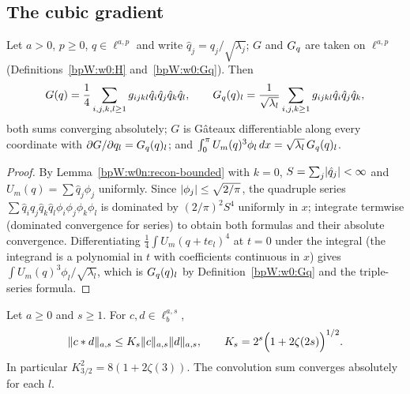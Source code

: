 \subsection{The cubic gradient}\label{bpW:w0n:gradient-sec}

\begin{lemma}\label{bpW:w0n:gradient}
Let $a>0$, $p\ge0$, $q\in\ell^{a,p}$ and write $\hat q_j=q_j/\sqrt{\lambda_j}$; $G$ and $G_q$ are taken on
$\ell^{a,p}$ (Definitions~\ref{bpW:w0:H} and~\ref{bpW:w0:Gq}). Then
\[G(q)=\frac14\sum_{i,j,k,l\ge1}g_{ijkl}\hat q_i\hat q_j\hat q_k\hat q_l,\qquad
G_q(q)_l=\frac{1}{\sqrt{\lambda_l}}\sum_{i,j,k\ge1}g_{ijkl}\hat q_i\hat q_j\hat q_k,\]
both sums converging absolutely; $G$ is G\^ateaux differentiable along every coordinate with
$\partial G/\partial q_l=G_q(q)_l$; and $\int_0^\pi U_m(q)^3\phi_l\,dx=\sqrt{\lambda_l}\,G_q(q)_l$.
\end{lemma}

\begin{proof}
By Lemma~\ref{bpW:w0n:recon-bounded} with $k=0$, $S=\sum_j\lvert \hat q_j\rvert<\infty$ and $U_m(q)=\sum\hat q_j\phi_j$
uniformly. Since $\lvert \phi_j\rvert\le\sqrt{2/\pi}$, the quadruple series $\sum\hat q_i\hat q_j\hat q_k\hat q_l\phi_i\phi_j\phi_k\phi_l$
is dominated by $(2/\pi)^2S^4$ uniformly in $x$; integrate termwise (dominated convergence for series) to obtain both
formulas and their absolute convergence. Differentiating $\frac14\int U_m(q+te_l)^4$ at $t=0$ under the integral
(the integrand is a polynomial in $t$ with coefficients continuous in $x$) gives
$\int U_m(q)^3\phi_l/\sqrt{\lambda_l}$, which is $G_q(q)_l$ by Definition~\ref{bpW:w0:Gq} and the triple-series
formula.
\end{proof}

\begin{lemma}\label{bpW:w0n:algebra}
Let $a\ge0$ and $s\ge1$. For $c,d\in\ell^{a,s}_b$,
\[\lVert c*d\rVert_{a,s}\le K_s\lVert c\rVert_{a,s}\lVert d\rVert_{a,s},\qquad K_s=2^{s}\Bigl(1+2\zeta(2s)\Bigr)^{1/2}.\]
In particular $K_{3/2}^2=8(1+2\zeta(3))$. The convolution sum converges absolutely for each $l$.
\end{lemma}


